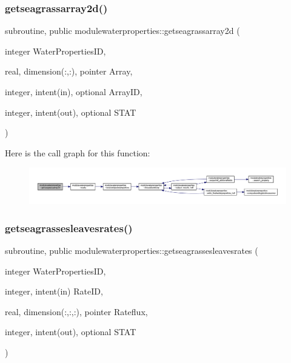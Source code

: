 \subsubsection{\texorpdfstring{getseagrassarray2d()}{getseagrassarray2d()}}
{\footnotesize\ttfamily subroutine, public modulewaterproperties\+::getseagrassarray2d (\begin{DoxyParamCaption}\item[{integer}]{Water\+Properties\+ID,  }\item[{real, dimension(\+:,\+:), pointer}]{Array,  }\item[{integer, intent(in), optional}]{Array\+ID,  }\item[{integer, intent(out), optional}]{S\+T\+AT }\end{DoxyParamCaption})}

Here is the call graph for this function\+:\nopagebreak
\begin{figure}[H]
\begin{center}
\leavevmode
\includegraphics[width=350pt]{namespacemodulewaterproperties_a627fb9974f1a0e254f8b0f6dfa4653ea_cgraph}
\end{center}
\end{figure}
\mbox{\label{namespacemodulewaterproperties_ae3241f210c7340a59547a54db80870aa}} 
\subsubsection{\texorpdfstring{getseagrassesleavesrates()}{getseagrassesleavesrates()}}
{\footnotesize\ttfamily subroutine, public modulewaterproperties\+::getseagrassesleavesrates (\begin{DoxyParamCaption}\item[{integer}]{Water\+Properties\+ID,  }\item[{integer, intent(in)}]{Rate\+ID,  }\item[{real, dimension(\+:,\+:,\+:), pointer}]{Rateflux,  }\item[{integer, intent(out), optional}]{S\+T\+AT }\end{DoxyParamCaption})}

